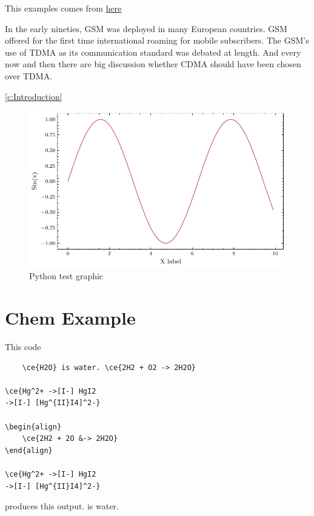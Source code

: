 This examples comes from \href{https://mirror.aarnet.edu.au/pub/CTAN/macros/latex/contrib/acronym/acronym.pdf}{here}

In the early nineties, \acs{GSM} was deployed in many European countries. \ac{GSM} offered for the first time international roaming for mobile subscribers. The \acs{GSM}’s use of \ac{TDMA} as its communication standard was debated at length. And every now and then there are big discussion whether \ac{CDMA} should have been chosen over \ac{TDMA}.

\autoref{c:Introduction}

\begin{figure}[h!]
    \centering
    \includegraphics{figures/test.pdf}
    \caption[Short caption]{Python test graphic}
    \label{fig:test}
\end{figure}

\section{Chem Example}
This code
\begin{lstlisting}
    \ce{H2O} is water. \ce{2H2 + O2 -> 2H2O}

\ce{Hg^2+ ->[I-] HgI2
->[I-] [Hg^{II}I4]^2-}

\begin{align}
    \ce{2H2 + 2O &-> 2H2O}
\end{align}

\ce{Hg^2+ ->[I-] HgI2
->[I-] [Hg^{II}I4]^2-}
\end{lstlisting}

produces this output. 
 is water. 



